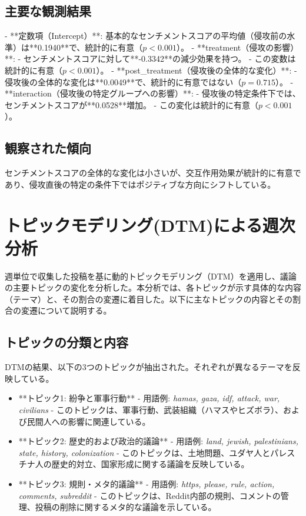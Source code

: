 \documentclass[11pt, a4j]{jreport}
\begin{document}
    \subsection*{主要な観測結果}
    - **定数項（Intercept）**: 基本的なセンチメントスコアの平均値（侵攻前の水準）は**0.1940**で、統計的に有意（$p < 0.001$）。
    - **treatment（侵攻の影響）**: 
      - センチメントスコアに対して**-0.3342**の減少効果を持つ。
      - この変数は統計的に有意（$p < 0.001$）。
    - **post\_treatment（侵攻後の全体的な変化）**:
      - 侵攻後の全体的な変化は**0.0049**で、統計的に有意ではない（$p = 0.715$）。
    - **interaction（侵攻後の特定グループへの影響）**:
      - 侵攻後の特定条件下では、センチメントスコアが**0.0528**増加。
      - この変化は統計的に有意（$p < 0.001$）。

    \subsection*{観察された傾向}
    センチメントスコアの全体的な変化は小さいが、交互作用効果が統計的に有意であり、侵攻直後の特定の条件下ではポジティブな方向にシフトしている。

    \section{トピックモデリング(DTM)による週次分析}

    週単位で収集した投稿を基に動的トピックモデリング（DTM）を適用し、議論の主要トピックの変化を分析した。本分析では、各トピックが示す具体的な内容（テーマ）と、その割合の変遷に着目した。以下に主なトピックの内容とその割合の変遷について説明する。

    \subsection*{トピックの分類と内容}
    DTMの結果、以下の3つのトピックが抽出された。それぞれが異なるテーマを反映している。

    \begin{itemize}
        \item **トピック1: 紛争と軍事行動**  
            - 用語例: \textit{hamas, gaza, idf, attack, war, civilians}  
            - このトピックは、軍事行動、武装組織（ハマスやヒズボラ）、および民間人への影響に関連している。
        \item **トピック2: 歴史的および政治的議論**  
            - 用語例: \textit{land, jewish, palestinians, state, history, colonization}  
            - このトピックは、土地問題、ユダヤ人とパレスチナ人の歴史的対立、国家形成に関する議論を反映している。
        \item **トピック3: 規則・メタ的議論**  
            - 用語例: \textit{https, please, rule, action, comments, subreddit}  
            - このトピックは、Reddit内部の規則、コメントの管理、投稿の削除に関するメタ的な議論を示している。
    \end{itemize}
\end{document}
